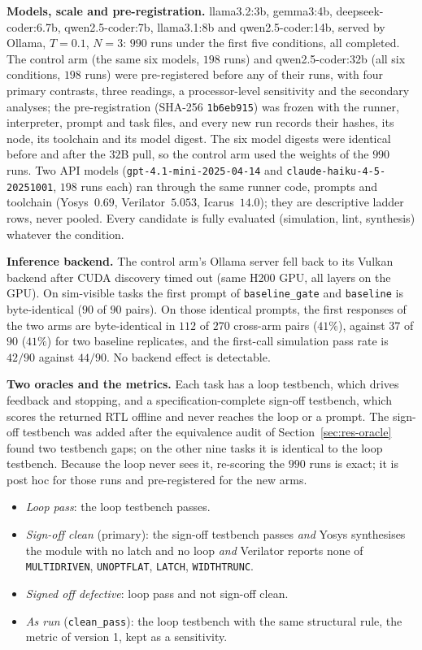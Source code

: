 \documentclass[11pt]{article}
\begin{document}
\textbf{Models, scale and pre-registration.} llama3.2:3b, gemma3:4b,
deepseek-coder:6.7b, qwen2.5-coder:7b, llama3.1:8b and qwen2.5-coder:14b,
served by Ollama, $T{=}0.1$, $N{=}3$: $990$ runs under the first five
conditions, all completed. The control arm (the same six models, $198$ runs)
and qwen2.5-coder:32b (all six conditions, $198$ runs) were pre-registered
before any of their runs, with four primary contrasts, three readings, a
processor-level sensitivity and the secondary analyses; the pre-registration
(SHA-256 \texttt{1b6eb915}) was frozen with the runner, interpreter, prompt and
task files, and every new run records their hashes, its node, its toolchain
and its model digest. The six model digests were identical before and after
the $32$B pull, so the control arm used the weights of the $990$ runs. Two API
models (\texttt{gpt-4.1-mini-2025-04-14} and \texttt{claude-haiku-4-5-20251001},
$198$ runs each) ran through the same runner code, prompts and toolchain
(Yosys~$0.69$, Verilator~$5.053$, Icarus~$14.0$); they are descriptive ladder
rows, never pooled. Every candidate is fully evaluated (simulation, lint,
synthesis) whatever the condition.

\textbf{Inference backend.} The control arm's Ollama server fell back to its
Vulkan backend after CUDA discovery timed out (same H200 GPU, all layers on
the GPU). On sim-visible tasks the first prompt of \texttt{baseline\_gate} and
\texttt{baseline} is byte-identical ($90$ of $90$ pairs). On those identical
prompts, the first responses of the two arms are byte-identical in $112$ of
$270$ cross-arm pairs ($41\%$), against $37$ of $90$ ($41\%$) for two baseline
replicates, and the first-call simulation pass rate is $42/90$ against
$44/90$. No backend effect is detectable.

\textbf{Two oracles and the metrics.} Each task has a loop testbench, which
drives feedback and stopping, and a specification-complete sign-off testbench,
which scores the returned RTL offline and never reaches the loop or a prompt.
The sign-off testbench was added after the equivalence audit of
Section~\ref{sec:res-oracle} found two testbench gaps; on the other nine tasks
it is identical to the loop testbench. Because the loop never sees it,
re-scoring the $990$ runs is exact; it is post hoc for those runs and
pre-registered for the new arms.
\begin{itemize}[leftmargin=1.2em, itemsep=0.1em]
\item \emph{Loop pass}: the loop testbench passes.
\item \emph{Sign-off clean} (primary): the sign-off testbench passes
\emph{and} Yosys synthesises the module with no latch and no loop \emph{and}
Verilator reports none of \texttt{MULTIDRIVEN}, \texttt{UNOPTFLAT},
\texttt{LATCH}, \texttt{WIDTHTRUNC}.
\item \emph{Signed off defective}: loop pass and not sign-off clean.
\item \emph{As run} (\texttt{clean\_pass}): the loop testbench with the same
structural rule, the metric of version 1, kept as a sensitivity.
\end{itemize}
\end{document}
